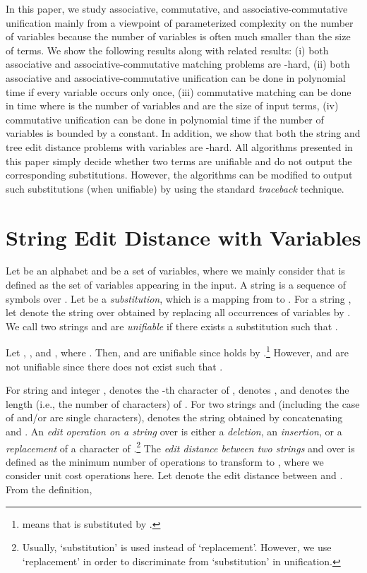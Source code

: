 \documentclass[a4paper]{llncs}
\begin{document}
In this paper, we study associative, commutative, and associative-commutative
unification mainly from a viewpoint of parameterized complexity on
the number of variables because
the number of variables is often much smaller than the size of terms.
We show the following results along with related results:
(i) both associative and
associative-commutative matching problems are -hard,
(ii) both associative and associative-commutative unification 
can be done in polynomial time if every variable occurs only once,
(iii) commutative matching can be done in  time
where  is the number of variables and  are the size of
input terms,
(iv) commutative unification can be done in polynomial time
if the number of variables is bounded by a constant.
In addition, we show that 
both the string and tree edit distance problems with variables 
are -hard.
All algorithms presented in this paper simply decide whether two terms
are unifiable and do not output the corresponding substitutions.
However, the algorithms can be modified to output such substitutions
(when unifiable)
by using the standard \emph{traceback} technique.

\section{String Edit Distance with Variables}

Let  be an alphabet and  be a set of variables,
where we mainly consider  that is defined as
the set of variables appearing in the input.
A string is a sequence of symbols over .
Let  be a \emph{substitution},
which is a mapping from  to .
For a string , let  denote the string over 
obtained by replacing all occurrences of variables 
by .
We call two strings  and  are \emph{unifiable}
if there exists a substitution  such that
.

\begin{example}
Let , , and ,
where .
Then,  and  are unifiable since
 holds
by .\footnote{ means that  is substituted by
.}
However,  and  are not unifiable since there does not exist
 such that .
\end{example}

For string  and integer ,  denotes the -th character of ,
 denotes , and
 denotes the length (i.e., the number of characters) of .
For two strings  and  (including the case of  and/or  are
single characters),
 denotes the string obtained by concatenating  and .
An {\it edit operation on a string}  over  is either
a {\it deletion}, an {\it insertion}, 
or a {\it replacement} of a character of  \cite{bodlaender95}.\footnote{
Usually, `substitution' is used instead of `replacement'.
However, we use `replacement' in order to discriminate
from `substitution' in unification.}
The {\it edit distance between two strings}  and  over 
is defined as
the minimum number of operations to transform  to ,
where we consider unit cost operations here.
Let  denote the edit distance 
between  and .
From the definition, 
  
\end{document}
